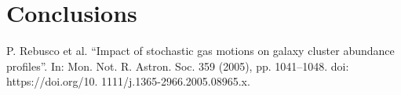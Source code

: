 \documentclass{article}
\begin{document}
\section*{Conclusions}



\begin{thebibliography}{1}
	P. Rebusco et al. “Impact of stochastic gas motions on galaxy cluster abundance profiles”.
In: Mon. Not. R. Astron. Soc. 359 (2005), pp. 1041–1048. doi: https://doi.org/10.
1111/j.1365-2966.2005.08965.x.
\end{thebibliography}
\end{document}
